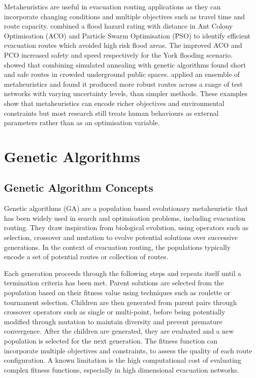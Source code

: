 \documentclass[12pt,a4paper]{report}
\begin{document}
Metaheuristics are useful in evacuation routing applications as they can incorporate changing conditions and multiple objectives such as travel time and route capacity. \cite{LI_2025_FLOODING} combined a flood hazard rating with distance in Ant Colony Optimisation (ACO) and Particle Swarm Optimisation (PSO) to identify efficient evacuation routes which avoided high risk flood areas. The improved ACO and PCO increased safety and speed respectively for the York flooding scenario. \cite{YANG_2024_SIMULATED_ANNEALING} showed that combining simulated annealing with genetic algorithms found short and safe routes in crowded underground public spaces. \cite{PRATAP_2025_ENSEMBLE} applied an ensemble of metaheuristics and found it produced more robust routes across a range of test networks with varying uncertainty levels, than simpler methods. These examples show that metaheuristics can encode richer objectives and environmental constraints but most research still treats human behaviours as external parameters rather than as an optimisation variable.

\section{Genetic Algorithms}
\subsection{Genetic Algorithm Concepts}
Genetic algorithms (GA) are a population based evolutionary metaheuristic that has been widely used in search and optimisation problems, including evacuation routing. They draw inspiration from biological evolution, using operators such as selection, crossover and mutation to evolve potential solutions over successive generations. In the context of evacuation routing, the populations typically encode a set of potential routes or collection of routes.

Each generation proceeds through the following steps and repeats itself until a termination criteria has been met. Parent solutions are selected from the population based on their fitness value using techniques such as roulette or tournament selection. Children are then generated from parent pairs through crossover operators such as single or multi-point, before being potentially modified through mutation to maintain diversity and prevent premature convergence. After the children are generated, they are evaluated and a new population is selected for the next generation. The fitness function can incorporate multiple objectives and constraints, to assess the quality of each route configuration. A known limitation is the high computational cost of evaluating complex fitness functions, especially in high dimensional evacuation networks.
\end{document}

